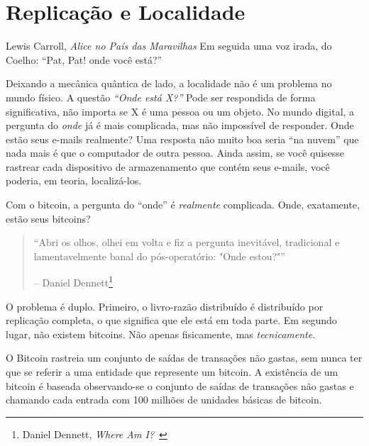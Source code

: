 \chapter{Replicação e Localidade}
\label{les:3}

\begin{chapquote}{Lewis Carroll, \textit{Alice no País das Maravilhas}}
Em seguida uma voz irada, do Coelho: \enquote{Pat, Pat! onde você está?}
\end{chapquote}

Deixando a mecânica quântica de lado, a localidade não é um problema no mundo físico. A questão \textit{\enquote{Onde está X?}} Pode ser respondida de forma significativa, não importa se X é uma pessoa ou um objeto. No mundo digital, a pergunta do \textit{onde} já é mais complicada, mas não impossível de responder. Onde estão seus e-mails realmente? Uma resposta não muito boa seria \enquote{na nuvem} que nada mais é que o computador de outra pessoa. Ainda assim, se você quisesse rastrear cada dispositivo de armazenamento que contém seus e-mails, você poderia, em teoria, localizá-los.

Com o bitcoin, a pergunta do \enquote{onde} é \textit{realmente} complicada. Onde, exatamente, estão seus bitcoins?

\begin{quotation}\begin{samepage}
\enquote{Abri os olhos, olhei em volta e fiz a pergunta inevitável, tradicional e lamentavelmente banal do pós-operatório: "Onde estou?"}
\begin{flushright} -- Daniel Dennett\footnote{Daniel Dennett, \textit{Where Am I?}~\cite{where-am-i}}
\end{flushright}\end{samepage}\end{quotation}

O problema é duplo. Primeiro, o livro-razão distribuído é distribuído por replicação completa, o que significa que ele está em toda parte. Em segundo lugar, não existem bitcoins. Não apenas fisicamente, mas \textit{tecnicamente}.

O Bitcoin rastreia um conjunto de saídas de transações não gastas, sem nunca ter que se referir a uma entidade que represente um bitcoin. A existência de um bitcoin é baseada observando-se o conjunto de saídas de transações não gastas e chamando cada entrada com 100 milhões de unidades básicas de bitcoin.

